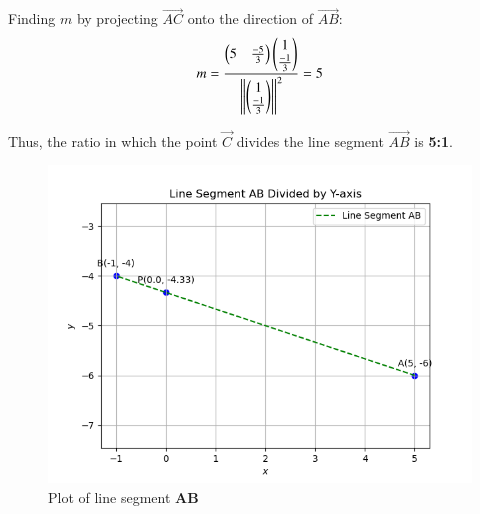 \documentclass[journal]{IEEEtran}
\begin{document}
Finding $m$ by projecting $\vec{AC}$ onto the direction of $\vec{AB}$:
\begin{align}
    m=\frac{\begin{pmatrix}5 & \frac{-5}{3}\end{pmatrix}\begin{pmatrix}1 \\ \frac{-1}{3}\end{pmatrix}}{\left\lVert\begin{pmatrix}1 \\ \frac{-1}{3}\end{pmatrix}\right\rVert^2}=5
\end{align}

Thus, the ratio in which the point $\vec{C}$ divides the line segment $\vec{AB}$ is \textbf{5:1}. \\

\begin{figure}[h!]
   \centering
   \includegraphics[width=0.7\linewidth]{figs/plot.png}
   \caption{Plot of line segment \textbf{AB}}
   \label{}
\end{figure}
\end{document}
